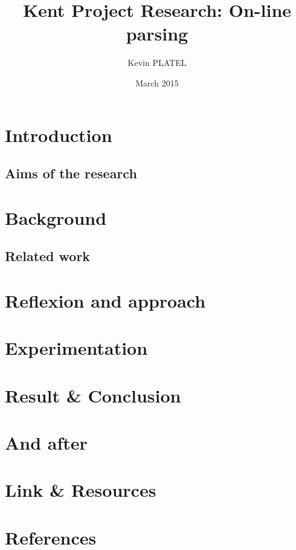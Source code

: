 \documentclass[11pt]{article}
\title{Kent Project Research: On-line parsing}
\author{Kevin PLATEL}
\date{March 2015}
\begin{document}
\maketitle

\renewcommand{\contentsname}{Abstract}

\renewcommand{\contentsname}{Table of contents}
\tableofcontents

\newpage{}

\section{Introduction}

    \subsection{Aims of the research}
    

\section{Background}

    
    \subsection{Related work}
    


\section{Reflexion and approach}

\section{Experimentation}

\section{Result \& Conclusion}

\section{And after}

\section{Link \& Resources}


\section{References}
\nocite{*}
 
\printbibliography
\end{document}
